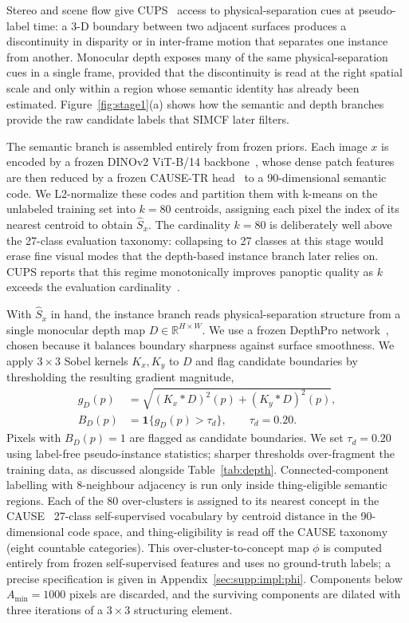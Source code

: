 \documentclass{article}
\begin{document}
Stereo and scene flow give CUPS~\cite{hahn2025cups} access to physical-separation cues at pseudo-label time: a 3-D boundary between two adjacent surfaces produces a discontinuity in disparity or in inter-frame motion that separates one instance from another. Monocular depth exposes many of the same physical-separation cues in a single frame, provided that the discontinuity is read at the right spatial scale and only within a region whose semantic identity has already been estimated. Figure~\ref{fig:stage1}(a) shows how the semantic and depth branches provide the raw candidate labels that SIMCF later filters.

The semantic branch is assembled entirely from frozen priors. Each image $x$ is encoded by a frozen DINOv2 ViT-B/14 backbone~\cite{oquab2024dinov2}, whose dense patch features are then reduced by a frozen CAUSE-TR head~\cite{kim2024cause} to a 90-dimensional semantic code. We L2-normalize these codes and partition them with k-means on the unlabeled training set into $k = 80$ centroids, assigning each pixel the index of its nearest centroid to obtain $\hat S_x$. The cardinality $k = 80$ is deliberately well above the 27-class evaluation taxonomy: collapsing to 27 classes at this stage would erase fine visual modes that the depth-based instance branch later relies on. CUPS reports that this regime monotonically improves panoptic quality as $k$ exceeds the evaluation cardinality~\cite{hahn2025cups}.

With $\hat S_x$ in hand, the instance branch reads physical-separation structure from a single monocular depth map $D \in \mathbb{R}^{H \times W}$. We use a frozen DepthPro network~\cite{bochkovskii2024depthpro}, chosen because it balances boundary sharpness against surface smoothness. We apply $3 \times 3$ Sobel kernels $K_x, K_y$ to $D$ and flag candidate boundaries by thresholding the resulting gradient magnitude,
\begin{equation}
\begin{aligned}
g_D(p) &= \sqrt{(K_x * D)^2(p) + (K_y * D)^2(p)}, \\
B_D(p) &= \mathbf{1}\{g_D(p) > \tau_d\}, \qquad \tau_d = 0.20 .
\end{aligned}
\label{eq:depth_boundary}
\end{equation}
Pixels with $B_D(p)=1$ are flagged as candidate boundaries. We set $\tau_d = 0.20$ using label-free pseudo-instance statistics; sharper thresholds over-fragment the training data, as discussed alongside Table~\ref{tab:depth}. Connected-component labelling with 8-neighbour adjacency is run only inside thing-eligible semantic regions. Each of the 80 over-clusters is assigned to its nearest concept in the CAUSE~\cite{kim2024cause} 27-class self-supervised vocabulary by centroid distance in the 90-dimensional code space, and thing-eligibility is read off the CAUSE taxonomy~\cite{kim2024cause} (eight countable categories). This over-cluster-to-concept map $\phi$ is computed entirely from frozen self-supervised features and uses no ground-truth labels; a precise specification is given in Appendix~\ref{sec:supp:impl:phi}. Components below $A_\text{min} = 1000$ pixels are discarded, and the surviving components are dilated with three iterations of a $3 \times 3$ structuring element.
\end{document}
